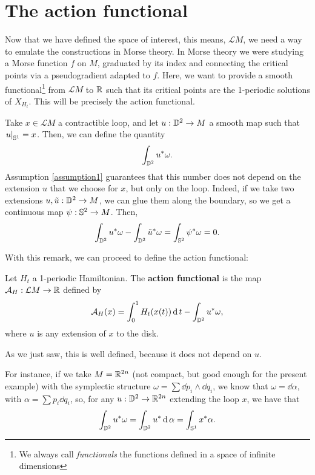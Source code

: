 \section{The action functional}

Now that we have defined the space of interest, this means, $\mathcal{L}M$, we need a way to emulate the constructions in Morse theory. In Morse theory we were studying a Morse function $f$ on $M$, graduated by its index and connecting the critical points via a pseudogradient adapted to $f$. Here, we want to provide a smooth functional\footnote{We always call {\it functionals} the functions defined in a space of infinite dimensions} from $\mathcal{L}M$ to $\mathbb{R}$ such that its critical points are the 1-periodic solutions of $X_{H_t}$. This will be precisely the action functional.

\begin{rmrk}
Take $x \in \mathcal{L}M$ a contractible loop, and let $u : \mathbb{D}^2 \rightarrow M$ a smooth map such that $\left. u \right|_{\mathbb{S}^1} = x$. Then, we can define the quantity
$$\int_{\mathbb{D}^2} u^{\ast}\omega .$$
Assumption \ref{assumption1} guarantees that this number does not depend on the extension $u$ that we choose for $x$, but only on the loop. Indeed, if we take two extensions $u, \tilde{u} : \mathbb{D}^2 \rightarrow M$, we can glue them along the boundary, so we get a continuous map $\psi : \mathbb{S}^2 \rightarrow M$. Then,
$$\int_{\mathbb{D}^2} u^{\ast} \omega - \int_{\mathbb{D}^2} \tilde{u}^{\ast} \omega = \int_{\mathbb{S}^2} \psi^{\ast} \omega = 0 .$$
\end{rmrk}

With this remark, we can proceed to define the action functional:

\begin{deff}
Let $H_t$ a 1-periodic Hamiltonian. The {\bf action functional} is the map $\mathcal{A}_H : \mathcal{L}M \rightarrow \mathbb{R}$ defined by
$$\mathcal{A}_H(x) = \int_0^1 H_t(x(t)) \operatorname d t - \int_{\mathbb{D}^2} u^{\ast} \omega ,$$
where $u$ is any extension of $x$ to the disk.
\end{deff}

As we just saw, this is well defined, because it does not depend on $u$.

For instance, if we take $M = \mathbb{R}^{2n}$ (not compact, but good enough for the present example) with the symplectic structure $\omega = \sum \dd p_i \wedge \dd q_i$, we know that $\omega = \dd \alpha$, with $\alpha = \sum p_i \dd q_i$, so, for any $u : \mathbb{D}^2 \rightarrow \mathbb{R}^{2n}$ extending the loop $x$, we have that
$$\int_{\mathbb{D}^2} u^{\ast} \omega = \int_{\mathbb{D}^2}  u^{\ast} \operatorname d \alpha = \int_{\mathbb{S}^1} x^{\ast} \alpha .$$

